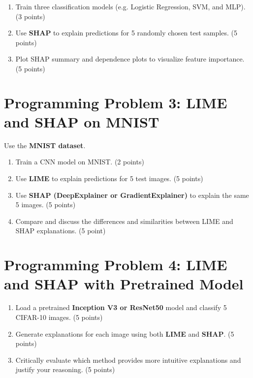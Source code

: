 \documentclass[11pt]{article}
\begin{document}
\begin{enumerate}
\item Train three classification models (e.g. Logistic Regression, SVM, and MLP). (3 points)

\item Use \textbf{SHAP} to explain predictions for 5 randomly chosen test samples. (5 points)

\item Plot SHAP summary and dependence plots to visualize feature importance. (5 points)
\end{enumerate}

\section*{Programming Problem 3: LIME and SHAP on MNIST}

Use the \textbf{MNIST dataset}.

\begin{enumerate}
\item Train a CNN model on MNIST. (2 points)

\item Use \textbf{LIME} to explain predictions for 5 test images. (5 points)

\item Use \textbf{SHAP (DeepExplainer or GradientExplainer)} to explain the same 5 images. (5 points)

\item Compare and discuss the differences and similarities between LIME and SHAP explanations. (5 point)
\end{enumerate}

\section*{Programming Problem 4: LIME and SHAP with Pretrained Model}

\begin{enumerate}
\item Load a pretrained \textbf{Inception V3 or ResNet50} model and classify 5 CIFAR-10 images. (5 points)

\item Generate explanations for each image using both \textbf{LIME} and \textbf{SHAP}. (5 points)

\item Critically evaluate which method provides more intuitive explanations and justify your reasoning. (5 points)
\end{enumerate}
\end{document}
